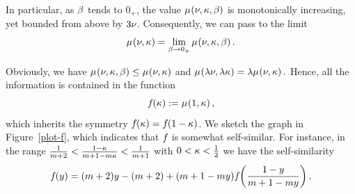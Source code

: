   In particular, as $\beta$ tends to $0_+$, the value
  $\SimpleCostOf{\TheTotal,\TheLength,\BufLength}$ is monotonically increasing, yet bounded from
  above by $3\nu$.  Consequently, we can pass to the limit
  \[
    \SimpleCostOf{\TheTotal,\TheLength} =
    \lim_{\BufLength\rightarrow 0_+} \SimpleCostOf{\TheTotal,\TheLength,\BufLength}
    .
  \]
  
  Obviously, we have $\SimpleCostOf{\TheTotal,\TheLength,\BufLength}
  \leq \SimpleCostOf{\TheTotal,\TheLength}$ and
  $\SimpleCostOf{\lambda\TheTotal,\lambda\TheLength}
  =\lambda \SimpleCostOf{\TheTotal,\TheLength}
  .
  $
  Hence, all the information is contained in the function
  \[
    \RelCostOf{\TheLength} := \SimpleCostOf{1,\TheLength},
  \]
  which inherits the symmetry
  $\RelCostOf{\TheLength} = \RelCostOf{1-\TheLength}$.  We sketch the graph in Figure~\ref{plot-f}, which indicates that
  $f_{}$ is somewhat self-similar. For instance, 
%
in the range
  $\frac{1}{m+2}< \frac{1-\kappa}{m+1-m\kappa} < \frac{1}{m+1}$ with    $0<\kappa<\frac12$ 
we have 
  the self-similarity
  \begin{equation}\label{reverse}
    \RelCostOf{\AltLength}
    = (m+2)\AltLength -(m+2) + (m+1-m\AltLength)
    \RelCostOf{\frac{1-\AltLength}{m + 1 - m\AltLength}}. 
  \end{equation}


